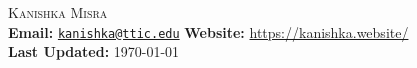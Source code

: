 \documentclass[11pt]{article}
\begin{document}
\begin{center}
\textsc{\LARGE Kanishka Misra} \\
\vspace{0.5em}
\textbf{Email:} \href{mailto:kanishka@ttic.edu}{\texttt{kanishka@ttic.edu}} \hspace{1em}
\textbf{Website:} \url{https://kanishka.website/}\\
\textbf{Last Updated:} \today
\end{center}


\end{document}
